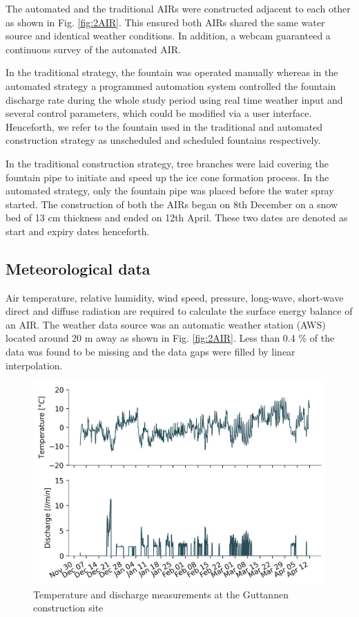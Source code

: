 \documentclass[tc, manuscript]{copernicus}
\begin{document}
The automated and the traditional AIRs were constructed adjacent to each other as shown in Fig. \ref{fig:2AIR}.
This ensured both AIRs shared the same water source and identical weather conditions. In addition, a webcam
guaranteed a continuous survey of the automated AIR.   

In the traditional strategy, the fountain was operated manually whereas in the automated strategy a programmed
automation system controlled the fountain discharge rate during the whole study period using real time weather
input and several control parameters, which could be modified via a user interface. Henceforth, we refer to the
fountain used in the traditional and automated construction strategy as unscheduled and scheduled fountains
respectively.

In the traditional construction strategy, tree branches were laid covering the fountain pipe to initiate and
speed up the ice cone formation process. In the automated strategy, only the fountain pipe was placed before the
water spray started. The construction of both the AIRs began on 8th December on a snow bed of 13 cm thickness
and ended on 12th April. These two dates are denoted as start and expiry dates henceforth.

\subsection{Meteorological data}

Air temperature, relative humidity, wind speed, pressure, long-wave, short-wave direct and diffuse radiation are
required to calculate the surface energy balance of an AIR.  The weather data source was an automatic weather
station (AWS) located around 20 m away as shown in Fig. \ref{fig:2AIR}. Less than 0.4 \% of the data was found
to be missing and the data gaps were filled by linear interpolation. 

\begin{figure}[t]
\includegraphics[width=12cm]{Figures/disvstemp.png}
\caption{Temperature and discharge measurements at the Guttannen construction site}
\label{fig:aws} 
\end{figure}
\end{document}
